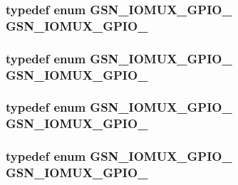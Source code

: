 \label{a00519_aa788aac64fd76e60de0f7108d60808ea}
\hypertarget{a00519_afc8d87b1fc003564a82a871280921d2b}{
\subsubsection[{GSN\_\-IOMUX\_\-GPIO\_\-6}]{\setlength{\rightskip}{0pt plus 5cm}typedef enum {\bf GSN\_\-IOMUX\_\-GPIO\_} {\bf GSN\_\-IOMUX\_\-GPIO\_}}}
\label{a00519_afc8d87b1fc003564a82a871280921d2b}
\hypertarget{a00519_a9f718135b692a4f2f08357282966b898}{
\subsubsection[{GSN\_\-IOMUX\_\-GPIO\_\-7}]{\setlength{\rightskip}{0pt plus 5cm}typedef enum {\bf GSN\_\-IOMUX\_\-GPIO\_} {\bf GSN\_\-IOMUX\_\-GPIO\_}}}
\label{a00519_a9f718135b692a4f2f08357282966b898}
\hypertarget{a00519_a5972e66ae1c647b3d1fc2788ec8b9396}{
\subsubsection[{GSN\_\-IOMUX\_\-GPIO\_\-8}]{\setlength{\rightskip}{0pt plus 5cm}typedef enum {\bf GSN\_\-IOMUX\_\-GPIO\_} {\bf GSN\_\-IOMUX\_\-GPIO\_}}}
\label{a00519_a5972e66ae1c647b3d1fc2788ec8b9396}
\hypertarget{a00519_a705ad4ccb2951abf027f8ade03097f07}{
\subsubsection[{GSN\_\-IOMUX\_\-GPIO\_\-9}]{\setlength{\rightskip}{0pt plus 5cm}typedef enum {\bf GSN\_\-IOMUX\_\-GPIO\_} {\bf GSN\_\-IOMUX\_\-GPIO\_}}}
\label{a00519_a705ad4ccb2951abf027f8ade03097f07}


